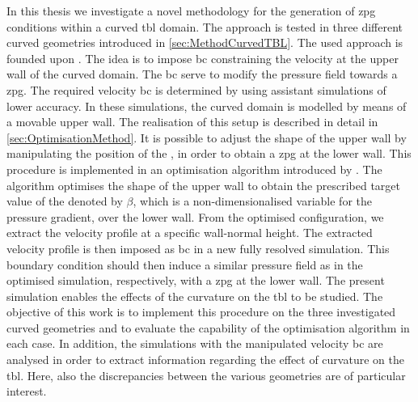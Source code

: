 In this thesis we investigate a novel methodology for the generation of \acrshort{zpg} conditions within a curved \acrshort{tbl} domain.
The approach is tested in three different curved geometries introduced in \autoref{sec:MethodCurvedTBL}.
The used approach is founded upon \citet{schlatter_leveraging_2025}.
The idea is to impose \acrlong{bc} constraining the velocity at the upper wall of the curved domain.
The \acrlong{bc} serve to modify the pressure field towards a \acrlong{zpg}.
The required velocity \acrshort{bc} is determined by using assistant simulations of lower accuracy.
In these simulations, the curved domain is modelled by means of a movable upper wall. 
The realisation of this setup is described in detail in \autoref{sec:OptimisationMethod}.
It is possible to adjust the shape of the upper wall by manipulating the position of the ,
in order to obtain a \acrshort{zpg} at the lower wall.
This procedure is implemented in an optimisation algorithm introduced by \citet{morita_applying_2022}.
The algorithm optimises the shape of the upper wall to obtain the prescribed target value of the  denoted by $\beta$, which is a non-dimensionalised variable for the pressure gradient, over the lower wall.
From the optimised configuration, we extract the velocity profile at a specific wall-normal height.
The extracted velocity profile is then imposed as \acrshort{bc} in a new fully resolved simulation.
This boundary condition should then induce a similar pressure field as in the optimised simulation, respectively, with a \acrlong{zpg} at the lower wall.
The present simulation enables the effects of the curvature on the \acrshort{tbl} to be studied.
The objective of this work is to implement this procedure on the three investigated curved geometries and to evaluate the capability of the optimisation algorithm in each case.
In addition, the simulations with the manipulated velocity \acrshort{bc} are analysed in order to extract information regarding the effect of curvature on the \acrshort{tbl}.
Here, also the discrepancies between the various geometries are of particular interest.\newpage


